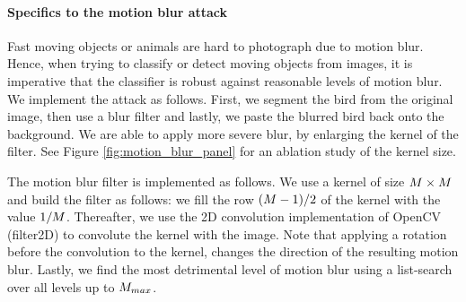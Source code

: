 \paragraph{Specifics to the motion blur attack}
Fast moving objects or animals are hard to photograph due to motion blur. Hence, when trying to classify or detect moving objects from images, it is imperative that the classifier is robust against reasonable levels of motion blur. We implement the attack as follows. First, we segment the bird from the original image, then use a blur filter and lastly, we paste the blurred bird back onto the background. We are able to apply more severe blur, by enlarging the kernel of the filter. See Figure \ref{fig:motion_blur_panel} for an ablation study of the kernel size. 

The motion blur filter is implemented as follows. We use a kernel of size $M \times M$ and build the filter as follows: we fill the row $(M-1)/2$ of the kernel with the value $1/M$. Thereafter, we use the 2D convolution implementation of OpenCV (filter2D) \cite{opencv_library} to convolute the kernel with the image. Note that applying a rotation before the convolution to the kernel, changes the direction of the resulting motion blur. Lastly, we find the most detrimental level of motion blur using a list-search over all levels up to $M_{max}$. 


